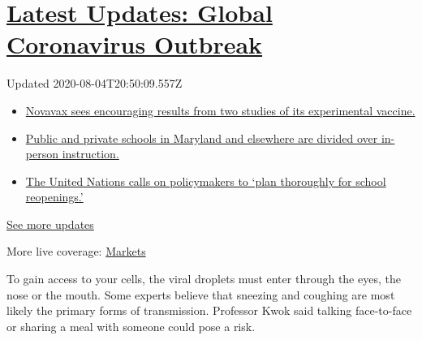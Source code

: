 \hypertarget{latest-updates-global-coronavirus-outbreak}{%
\section{\texorpdfstring{\href{https://www.nytimes.com/2020/08/04/world/coronavirus-cases.html?action=click\&pgtype=Article\&state=default\&region=MAIN_CONTENT_1\&context=storylines_live_updates}{Latest
Updates: Global Coronavirus
Outbreak}}{Latest Updates: Global Coronavirus Outbreak}}\label{latest-updates-global-coronavirus-outbreak}}

Updated 2020-08-04T20:50:09.557Z

\begin{itemize}
\tightlist
\item
  \href{https://www.nytimes.com/2020/08/04/world/coronavirus-cases.html?action=click\&pgtype=Article\&state=default\&region=MAIN_CONTENT_1\&context=storylines_live_updates\#link-1228a480}{Novavax
  sees encouraging results from two studies of its experimental
  vaccine.}
\item
  \href{https://www.nytimes.com/2020/08/04/world/coronavirus-cases.html?action=click\&pgtype=Article\&state=default\&region=MAIN_CONTENT_1\&context=storylines_live_updates\#link-4825b93}{Public
  and private schools in Maryland and elsewhere are divided over
  in-person instruction.}
\item
  \href{https://www.nytimes.com/2020/08/04/world/coronavirus-cases.html?action=click\&pgtype=Article\&state=default\&region=MAIN_CONTENT_1\&context=storylines_live_updates\#link-50f7386d}{The
  United Nations calls on policymakers to `plan thoroughly for school
  reopenings.'}
\end{itemize}

\href{https://www.nytimes.com/2020/08/04/world/coronavirus-cases.html?action=click\&pgtype=Article\&state=default\&region=MAIN_CONTENT_1\&context=storylines_live_updates}{See
more updates}

More live coverage:
\href{https://www.nytimes.com/live/2020/08/04/business/stock-market-today-coronavirus?action=click\&pgtype=Article\&state=default\&region=MAIN_CONTENT_1\&context=storylines_live_updates}{Markets}

To gain access to your cells, the viral droplets must enter through the
eyes, the nose or the mouth. Some experts believe that sneezing and
coughing are most likely the primary forms of transmission. Professor
Kwok said talking face-to-face or sharing a meal with someone could pose
a risk.

